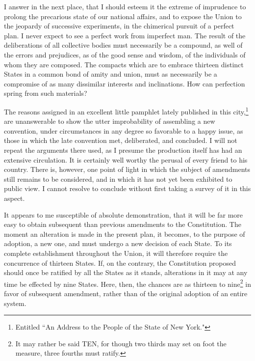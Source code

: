 I answer in the next place, that I should esteem it the extreme of imprudence to prolong the precarious state of our national affairs, and to expose the Union to the jeopardy of successive experiments, in the chimerical pursuit of a perfect plan. 
I never expect to see a perfect work from imperfect man. 
The result of the deliberations of all collective bodies must necessarily be a compound, as well of the errors and prejudices, as of the good sense and wisdom, of the individuals of whom they are composed. 
The compacts which are to embrace thirteen distinct States in a common bond of amity and union, must as necessarily be a compromise of as many dissimilar interests and inclinations. 
How can perfection spring from such materials?

The reasons assigned in an excellent little pamphlet lately published in this city,\footnote{Entitled ``An Address to the People of the State of New York."} are unanswerable to show the utter improbability of assembling a new convention, under circumstances in any degree so favorable to a happy issue, as those in which the late convention met, deliberated, and concluded. 
I will not repeat the arguments there used, as I presume the production itself has had an extensive circulation. 
It is certainly well worthy the perusal of every friend to his country. 
There is, however, one point of light in which the subject of amendments still remains to be considered, and in which it has not yet been exhibited to public view. 
I cannot resolve to conclude without first taking a survey of it in this aspect.

It appears to me susceptible of absolute demonstration, that it will be far more easy to obtain subsequent than previous amendments to the Constitution. 
The moment an alteration is made in the present plan, it becomes, to the purpose of adoption, a new one, and must undergo a new decision of each State. 
To its complete establishment throughout the Union, it will therefore require the concurrence of thirteen States. 
If, on the contrary, the Constitution proposed should once be ratified by all the States as it stands, alterations in it may at any time be effected by nine States. 
Here, then, the chances are as thirteen to nine\footnote{It may rather be said TEN, for though two thirds may set on foot the measure, three fourths must ratify.} in favor of subsequent amendment, rather than of the original adoption of an entire system.

